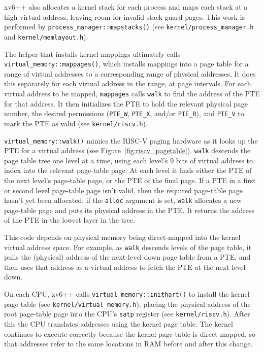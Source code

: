 xv6++ also allocates a kernel stack for each process and maps each stack
at a high virtual address, leaving room for invalid stack-guard pages.
This work is performed by \lstinline{process_manager::mapstacks()}
(see \texttt{kernel/process\_manager.h} and \texttt{kernel/memlayout.h}).

The helper that installs kernel mappings ultimately calls
\lstinline{virtual_memory::mappages()}, which installs mappings into a
page table for a range of virtual addresses to a corresponding range of
physical addresses. It does this separately for each virtual address in
the range, at page intervals. For each virtual address to be mapped,
\lstinline{mappages} calls \lstinline{walk} to find the address of the PTE
for that address. It then initializes the PTE to hold the relevant
physical page number, the desired permissions (\lstinline{PTE_W},
\lstinline{PTE_X}, and/or \lstinline{PTE_R}), and \lstinline{PTE_V} to mark
the PTE as valid (see \texttt{kernel/riscv.h}).

\lstinline{virtual_memory::walk()} mimics the RISC-V paging hardware as it
looks up the PTE for a virtual address (see Figure~\ref{fig:riscv_pagetable}).
\lstinline{walk} descends the page table tree one level at a time, using each
level's 9 bits of virtual address to index into the relevant page-table page.
At each level it finds either the PTE of the next level's page-table page, or
the PTE of the final page. If a PTE in a first or second level page-table page
isn't valid, then the required page-table page hasn't yet been allocated; if the
\lstinline{alloc} argument is set, \lstinline{walk} allocates a new page-table page
and puts its physical address in the PTE. It returns the address of the PTE in the
lowest layer in the tree.

This code depends on physical memory being direct-mapped into the kernel
virtual address space. For example, as \lstinline{walk} descends levels of
the page table, it pulls the (physical) address of the next-level-down
page table from a PTE, and then uses that address as a virtual address to
fetch the PTE at the next level down.

On each CPU, xv6++ calls \lstinline{virtual_memory::inithart()} to install
the kernel page table (see \texttt{kernel/virtual\_memory.h}), placing the
physical address of the root page-table page into the CPU's \texttt{satp}
register (see \texttt{kernel/riscv.h}). After this the CPU translates
addresses using the kernel page table. The kernel continues to execute
correctly because the kernel page table is direct-mapped, so that
addresses refer to the same locations in RAM before and after this change.


